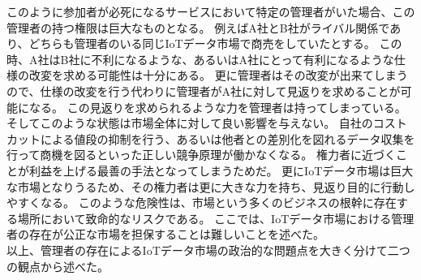 このように参加者が必死になるサービスにおいて特定の管理者がいた場合、この管理者の持つ権限は巨大なものとなる。
例えばA社とB社がライバル関係であり、どちらも管理者のいる同じIoTデータ市場で商売をしていたとする。
この時、A社はB社に不利になるような、あるいはA社にとって有利になるような仕様の改変を求める可能性は十分にある。
更に管理者はその改変が出来てしまうので、仕様の改変を行う代わりに管理者がA社に対して見返りを求めることが可能になる。
この見返りを求められるような力を管理者は持ってしまっている。
そしてこのような状態は市場全体に対して良い影響を与えない。
自社のコストカットによる値段の抑制を行う、あるいは他者との差別化を図れるデータ収集を行って商機を図るといった正しい競争原理が働かなくなる。
権力者に近づくことが利益を上げる最善の手法となってしまうためだ。
更にIoTデータ市場は巨大な市場となりうるため、その権力者は更に大きな力を持ち、見返り目的に行動しやすくなる。
このような危険性は、市場という多くのビジネスの根幹に存在する場所において致命的なリスクである。
ここでは、IoTデータ市場における管理者の存在が公正な市場を担保することは難しいことを述べた。 \\
以上、管理者の存在によるIoTデータ市場の政治的な問題点を大きく分けて二つの観点から述べた。

